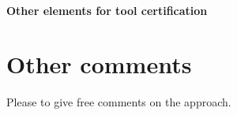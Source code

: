 \paragraph{Other elements for tool certification}

\section{Other comments}
Please to  give free comments on the approach.




